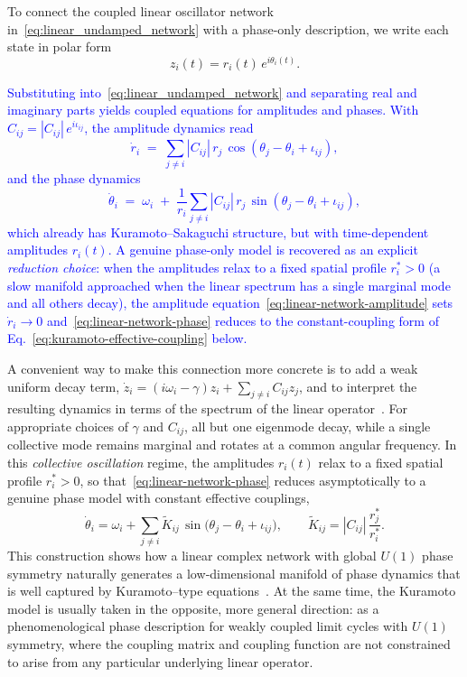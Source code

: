 \documentclass[12pt]{article}
\numberwithin{equation}{section}
\newcommand{\rev}[1]{\textcolor{blue}{#1}}
\begin{document}
To connect the coupled linear oscillator network in~\eqref{eq:linear_undamped_network} with a phase‐only description, we write each state in polar form
\begin{equation}
    z_i(t) = r_i(t)\,e^{i\theta_i(t)}.
\end{equation}

\rev{Substituting into~\eqref{eq:linear_undamped_network} and separating real and imaginary parts yields coupled equations for amplitudes and phases. With $C_{ij}=|C_{ij}|\,e^{i\iota_{ij}}$, the amplitude dynamics read
\begin{equation}
\dot r_i \;=\; \sum_{j\ne i} |C_{ij}|\, r_j\, \cos\!\left(\theta_j - \theta_i + \iota_{ij}\right),
\label{eq:linear-network-amplitude}
\end{equation}
and the phase dynamics
\begin{equation}
\dot\theta_i \;=\; \omega_i \;+\; \frac{1}{r_i}\sum_{j\ne i} |C_{ij}|\, r_j\, \sin\!\left(\theta_j - \theta_i + \iota_{ij}\right),
\label{eq:linear-network-phase}
\end{equation}
which already has Kuramoto--Sakaguchi structure, but with time-dependent amplitudes $r_i(t)$. A genuine phase-only model is recovered as an explicit \emph{reduction choice}: when the amplitudes relax to a fixed spatial profile $r_i^{*}>0$ (a slow manifold approached when the linear spectrum has a single marginal mode and all others decay), the amplitude equation~\eqref{eq:linear-network-amplitude} sets $\dot r_i \to 0$ and~\eqref{eq:linear-network-phase} reduces to the constant-coupling form of Eq.~\eqref{eq:kuramoto-effective-coupling} below.}

A convenient way to make this connection more concrete is to add a weak uniform decay term, $\dot z_i = (i\omega_i - \gamma) z_i + \sum_{j\neq i} C_{ij}z_j$, and to interpret the resulting dynamics in terms of the spectrum of the linear operator~\cite{Roberts2008,Conteville2013}. For appropriate choices of $\gamma$ and $C_{ij}$, all but one eigenmode decay, while a single collective mode remains marginal and rotates at a common angular frequency. In this \emph{collective oscillation} regime, the amplitudes $r_i(t)$ relax to a fixed spatial profile $r_i^\ast>0$, so that~\eqref{eq:linear-network-phase} reduces asymptotically to a genuine phase model with constant effective couplings,
\begin{equation}
    \dot\theta_i
    =
    \omega_i
    +
    \sum_{j\neq i}
      \tilde K_{ij}\,
      \sin\!\bigl(\theta_j-\theta_i+\iota_{ij}\bigr),
    \qquad
    \tilde K_{ij} = |C_{ij}|\,\frac{r_j^\ast}{r_i^\ast}.
    \label{eq:kuramoto-effective-coupling}
\end{equation}
This construction shows how a linear complex network with global $U(1)$ phase symmetry naturally generates a low‑dimensional manifold of phase dynamics that is well captured by Kuramoto–type equations~\cite{Kuramoto1984,Nakao2016,Pietras2019}. At the same time, the Kuramoto model is usually taken in the opposite, more general direction: as a phenomenological phase description for weakly coupled limit cycles with $U(1)$ symmetry, where the coupling matrix and coupling function are not constrained to arise from any particular underlying linear operator.
\end{document}
